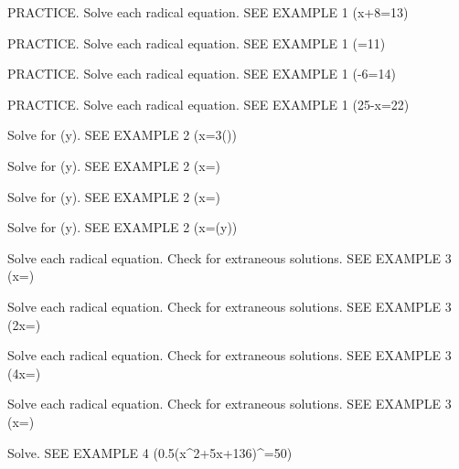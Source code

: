 \documentclass{article}
\newenvironment{practice}[2]{}{}        %
\newcommand{\answer}[1]{}               %
\newcommand{\te}[1]{}                   %
\begin{document}
\begin{practice}{21}{1}
PRACTICE. Solve each radical equation. SEE EXAMPLE 1
(\sqrt[3]x+8=13)
\answer{125}
\end{practice}
\begin{practice}{22}{1}
PRACTICE. Solve each radical equation. SEE EXAMPLE 1
(=11)
\answer{30.25}
\end{practice}
\begin{practice}{23}{1}
PRACTICE. Solve each radical equation. SEE EXAMPLE 1
(-6=14)
\answer{325}
\end{practice}
\begin{practice}{24}{1}
PRACTICE. Solve each radical equation. SEE EXAMPLE 1
(25-\sqrt[4]x=22)
\answer{81}
\end{practice}
\begin{practice}{25}{1}
Solve for (y). SEE EXAMPLE 2
(x=3())
\answer{(y=\frac{x^3}{27}-15)}
\te{Answer printed on PDF page 58.}
\end{practice}
\begin{practice}{26}{1}
Solve for (y). SEE EXAMPLE 2
(x=)
\answer{(y=338x^2)}
\end{practice}
\begin{practice}{27}{1}
Solve for (y). SEE EXAMPLE 2
(x=)
\answer{(y=0.0025x^2+14.2)}
\end{practice}
\begin{practice}{28}{1}
Solve for (y). SEE EXAMPLE 2
(x=(\sqrt[4]y))
\answer{(y=81x^4)}
\end{practice}
\begin{practice}{29}{1}
Solve each radical equation. Check for extraneous solutions. SEE EXAMPLE 3
(x=)
\answer{(x=3)}
\end{practice}
\begin{practice}{30}{1}
Solve each radical equation. Check for extraneous solutions. SEE EXAMPLE 3
(2x=)
\answer{(x=\frac54) and (x=3)}
\end{practice}
\begin{practice}{31}{1}
Solve each radical equation. Check for extraneous solutions. SEE EXAMPLE 3
(4x=)
\answer{(x=1)}
\end{practice}
\begin{practice}{32}{1}
Solve each radical equation. Check for extraneous solutions. SEE EXAMPLE 3
(x=)
\answer{(x=7)}
\end{practice}
\begin{practice}{33}{1}
Solve. SEE EXAMPLE 4
(0.5(x^2+5x+136)^{}=50)
\answer{(x=27) and (x=-32)}
\end{practice}
\end{document}
